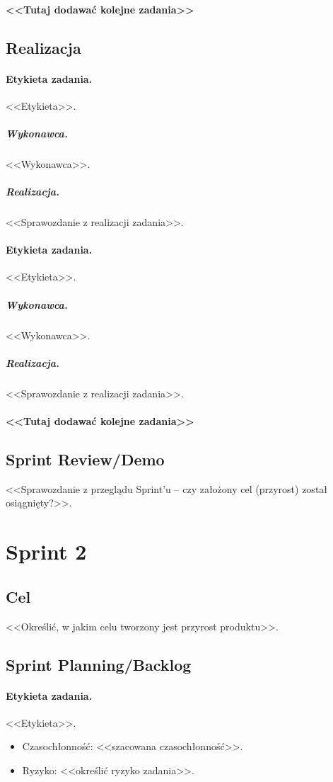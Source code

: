 \documentclass[a4paper]{article}
\begin{document}
\paragraph{<<Tutaj dodawać kolejne zadania>>}

\subsection{Realizacja}

\paragraph{Etykieta zadania.} <<Etykieta>>.
\subparagraph{Wykonawca.} <<Wykonawca>>.
\subparagraph{Realizacja.} <<Sprawozdanie z realizacji zadania>>.

\paragraph{Etykieta zadania.} <<Etykieta>>.
\subparagraph{Wykonawca.} <<Wykonawca>>.
\subparagraph{Realizacja.} <<Sprawozdanie z realizacji zadania>>.

\paragraph{<<Tutaj dodawać kolejne zadania>>}


\subsection{Sprint Review/Demo}
<<Sprawozdanie z przeglądu Sprint'u -- czy założony cel (przyrost) został osiągnięty?>>.

\section{Sprint 2}

\subsection{Cel} <<Określić, w jakim celu tworzony jest przyrost produktu>>.

\subsection{Sprint Planning/Backlog}

\paragraph{Etykieta zadania.} <<Etykieta>>.
\begin{itemize}
\item Czasochłonność: <<szacowana czasochłonność>>.
\item{Ryzyko:} <<określić ryzyko zadania>>.
\end{itemize}
\end{document}
